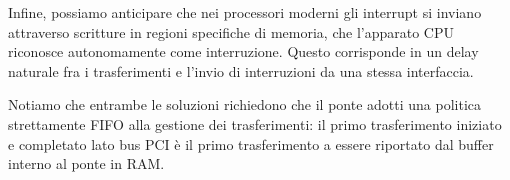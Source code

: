\documentclass[a4paper,11pt]{article}
\begin{document}
Infine, possiamo anticipare che nei processori moderni gli interrupt si inviano attraverso scritture in regioni specifiche di memoria, che l'apparato CPU riconosce autonomamente come interruzione.
Questo corrisponde in un delay naturale fra i trasferimenti e l'invio di interruzioni da una stessa interfaccia.

Notiamo che entrambe le soluzioni richiedono che il ponte adotti una politica strettamente FIFO alla gestione dei trasferimenti: il primo trasferimento iniziato e completato lato bus PCI è il primo trasferimento a essere riportato dal buffer interno al ponte in RAM.
\end{document}
